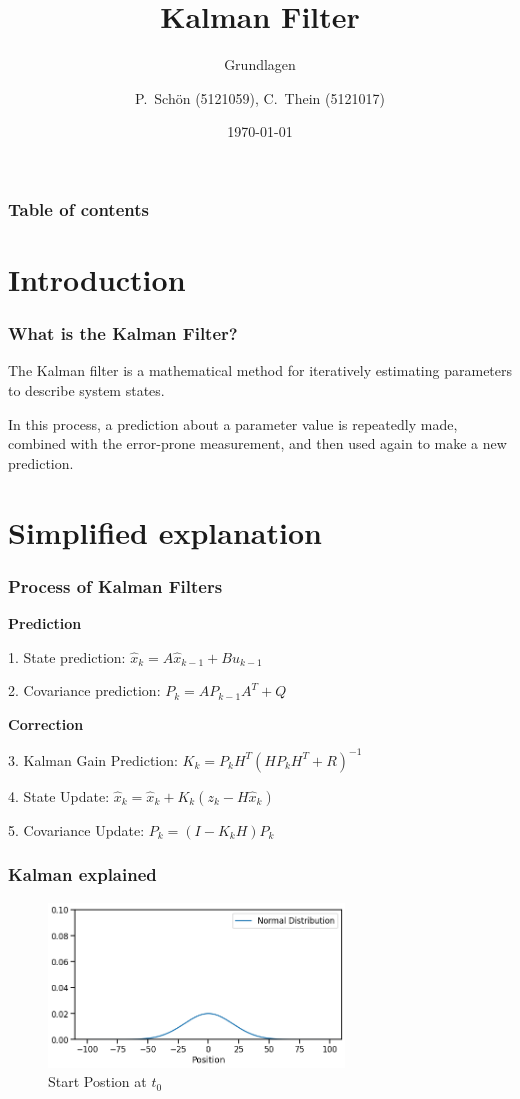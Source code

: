 \documentclass{beamer}
\title{Kalman Filter}
\subtitle{Grundlagen}
\author{P.~Schön (5121059), C.~Thein (5121017)}
\date{\today}
\begin{document}
\frame{\titlepage}

\begin{frame}
    \frametitle{Table of contents}
    \tableofcontents
\end{frame}

\section{Introduction}

\begin{frame}
    \frametitle{What is the Kalman Filter?}
    The Kalman filter is a mathematical method for iteratively estimating parameters to describe
    system states.

    In this process, a prediction about a parameter value is repeatedly made, combined with the
    error-prone measurement, and then used again to make a new prediction.
\end{frame}

\section{Simplified explanation}

\begin{frame}
    \frametitle{Process of Kalman Filters}

    \textbf{Prediction}

    1. State prediction: \( \hat{x}_{k} = A\hat{x}_{k-1}+Bu_{k-1} \)

    2. Covariance prediction: \( P_{k}=AP_{k-1}A^{T}+Q \)

    \textbf{Correction}

    3. Kalman Gain Prediction: \( K_{k}=P_{k}H^{T}(HP_{k}H^T+R)^{-1} \)

    4. State Update: \( \hat{x}_{k}=\hat{x}_{k}+K_{k}(z_{k}-H\hat{x}_{k}) \)

    5. Covariance Update: \( P_{k}=(I-K_{k}H)P_{k} \)
\end{frame}


\begin{frame}
    \frametitle{Kalman explained}
    \begin{figure}
        \centering
        \includegraphics[width=0.7\textwidth]{images/01_normal_distribution.png}
        \caption{Start Postion at \(t_0\)}
    \end{figure}
\end{frame}
\end{document}

